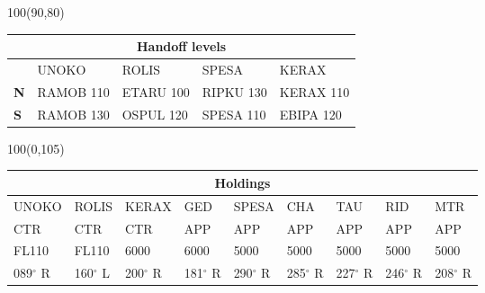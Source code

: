 \documentclass[10pt,landscape,a4paper]{article}
\begin{document}
\begin{textblock}{100}(90,80)
\begin{table}[]
\begin{tabular}{|l|l|l|l|l|}
\multicolumn{5}{c}{\textbf{Handoff levels}}              \\ \hline
           & UNOKO     & ROLIS     & SPESA     & KERAX     \\ \hline
\textbf{N} & RAMOB 110 & ETARU 100 & RIPKU 130 & KERAX 110 \\ \hline
\textbf{S} & RAMOB 130 & OSPUL 120 & SPESA 110 & EBIPA 120 \\ \hline
\end{tabular}
\end{table}
\end{textblock}

\begin{textblock}{100}(0,105)
\begin{table}[]
\begin{tabular}{|l|l|l|l|l|l|l|l|l|}
\hline
\multicolumn{9}{|c|}{\textbf{Holdings}}                                        \\ \hline
UNOKO  & ROLIS  & KERAX  & GED    & SPESA  & CHA    & TAU    & RID    & MTR    \\ \hline
CTR    & CTR    & CTR    & APP    & APP    & APP    & APP    & APP    & APP    \\ \hline
FL110  & FL110  & 6000   & 6000   & 5000   & 5000   & 5000   & 5000   & 5000   \\ \hline
089$^\circ$ R & 160$^\circ$ L & 200$^\circ$ R & 181$^\circ$ R & 290$^\circ$ R & 285$^\circ$ R & 227$^\circ$ R & 246$^\circ$ R & 208$^\circ$ R \\ \hline
\end{tabular}
\end{table}
\end{textblock}
\end{document}
